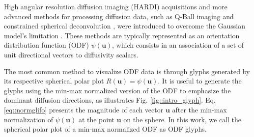 \documentclass[twoside,twocolumn,10pt]{article}
\begin{document}
High angular resolution diffusion imaging (HARDI) acquisitions and more advanced methods for processing diffusion data, such as Q-Ball imaging \cite{TuchQBall2004} and constrained spherical deconvolution \cite{tournier2007}, were introduced to overcome the Gaussian model's limitation \cite{descoteaux2015}. These methods are typically represented as an orientation distribution function (ODF) $\psi(\bm{u})$, which consists in an association of a set of unit directional vectors to diffusivity scalars. %



The most common method to visualize ODF data is through glyphs generated by its respective spherical polar plot $R(\bm{u})=\psi (\bm{u})$. It is useful to generate the glyphs using the min-max normalized version of the ODF \cite{TuchQBall2004} to emphasize the dominant diffusion directions, as illustrates Fig. \ref{fig::intro_glyph}. Eq. \ref{eq::normglifo} presents the magnitude of each vector $\bm{u}$ after the min-max normalization of $\psi(\bm{u})$ at the point $\bm{u}$ on the sphere. In this work, we call the spherical polar plot of a min-max normalized ODF as ODF glyphs.
\end{document}
